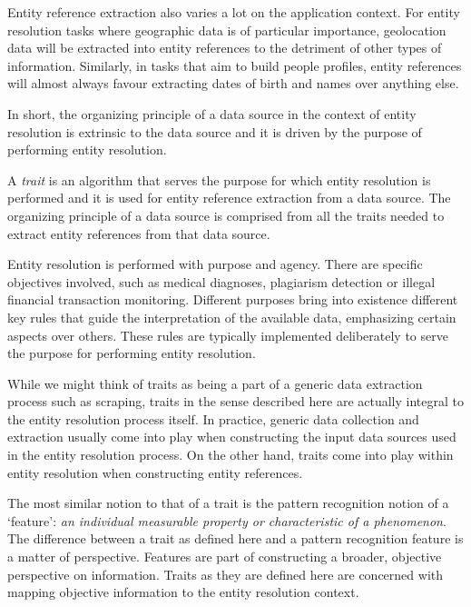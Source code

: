 Entity reference extraction also varies a lot on the application context.
For entity resolution tasks where geographic data is of particular importance,
geolocation data will be extracted into entity references to the detriment of
other types of information.
Similarly, in tasks that aim to build people profiles, entity references will
almost always favour extracting dates of birth and names over anything else.

In short, the organizing principle of a data source in the context of entity
resolution is extrinsic to the data source and it is driven by the purpose of
performing entity resolution.

\begin{defn}
    A \textit{trait} is an algorithm that serves the purpose for which entity
    resolution is performed and it is used for entity reference extraction from
    a data source. The organizing principle of a data source is comprised from
    all the traits needed to extract entity references from that data source.
\end{defn}

Entity resolution is performed with purpose and agency.
There are specific objectives involved, such as medical diagnoses, plagiarism
detection or illegal financial transaction monitoring.
Different purposes bring into existence different key rules that guide the
interpretation of the available data, emphasizing certain aspects over others.
These rules are typically implemented deliberately to serve the purpose for
performing entity resolution.

While we might think of traits as being a part of a generic data extraction
process such as scraping, traits in the sense described here are actually
integral to the entity resolution process itself.
In practice, generic data collection and extraction usually come into play when
constructing the input data sources used in the entity resolution process.
On the other hand, traits come into play within entity resolution when
constructing entity references.

The most similar notion to that of a trait is the pattern recognition notion of
a `feature':
\textit{an individual measurable property or characteristic of a
phenomenon}\cite{bishop2006pattern}.
The difference between a trait as defined here and a pattern recognition feature
is a matter of perspective.
Features are part of constructing a broader, objective perspective on
information.
Traits as they are defined here are concerned with mapping objective information
to the entity resolution context.

